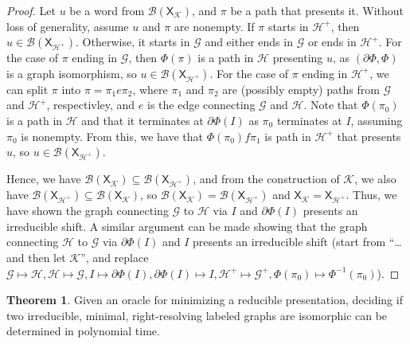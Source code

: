 \documentclass{article}
\newcommand{\Gc}{\mathcal{G}}  %
\newcommand{\Hc}{\mathcal{H}}  %
\newcommand{\Bc}{\mathcal{B}}
\newcommand{\Kc}{\mathcal{K}}
\newcommand{\shift}[1]{\mathsf{X}_{#1}}
\theoremstyle{definition}
\newtheorem{theorem}{Theorem}
\begin{document}
\begin{proof}
        Let \(u\) be a word from \(\Bc(\shift{\Kc})\), and \(\pi\) be a path that presents it.
        Without loss of generality, assume \(u\) and \(\pi\) are nonempty.
        If \(\pi\) starts in \(\Hc^+\), then \(u \in \Bc(\shift{\Hc^+})\). Otherwise, it 
        starts in \(\Gc\) and either ends in \(\Gc\) or ends in \(\Hc^+\). 
        For the case of \(\pi\) ending in \(\Gc\), then \(\Phi(\pi)\) is a path in 
        \(\Hc\) presenting \(u\), as \((\partial\Phi, \Phi)\) is a graph isomorphism,
        so \(u \in \Bc(\shift{\Hc^+})\).
        For the case of \(\pi\) ending in \(\Hc^+\), we can split 
        \(\pi\) into \(\pi=\pi_1 e \pi_2\), where \(\pi_1\) and \(\pi_2\)
        are (possibly empty) paths from \(\Gc\) and \(\Hc^+\), respectivley, and 
        \(e\) is the edge connecting \(\Gc\) and \(\Hc\). Note 
        that \(\Phi(\pi_0)\) is a path in \(\Hc\) and that it terminates
        at \(\partial\Phi(I)\) as \(\pi_0\) terminates at \(I\), assuming \(\pi_0\) is nonempty.
        From this, we have that \(\Phi(\pi_0)f\pi_1\) is path in \(\Hc^+\) that presents \(u\), 
        so \(u \in \Bc(\shift{\Hc^+})\).

        Hence, we have \(\Bc(\shift{\Kc}) \subseteq \Bc(\shift{\Hc^+})\), and from 
        the construction of \(\Kc\), we also have \(\Bc(\shift{\Hc^+}) \subseteq \Bc(\shift{\Kc})\), 
        so \(\Bc(\shift{\Kc}) = \Bc(\shift{\Hc^+})\) and \(\shift{\Kc} = \shift{\Hc^+}\). Thus,
        we have shown the graph connecting \(\Gc\) to \(\Hc\) via \(I\) and \(\partial\Phi(I)\)
        presents an irreducible shift. A similar argument can be made showing that 
        the graph connecting \(\Hc\) to \(\Gc\) via \(\partial\Phi(I)\) and \(I\) presents 
        an irreducible shift (start from ``\dots and then let \(\Kc\)'', and replace
        \(\Gc \mapsto \Hc, \Hc \mapsto \Gc, I \mapsto \partial\Phi(I), \partial\Phi(I) \mapsto I,
        \Hc^+ \mapsto \Gc^+, \Phi(\pi_0) \mapsto \Phi^{-1}(\pi_0)\)).
    \end{proof}

    \begin{theorem}
        Given an oracle for minimizing a reducible presentation, deciding 
        if two irreducible, minimal, right-resolving labeled graphs are isomorphic can be determined in polynomial time.
    \end{theorem}
\end{document}
